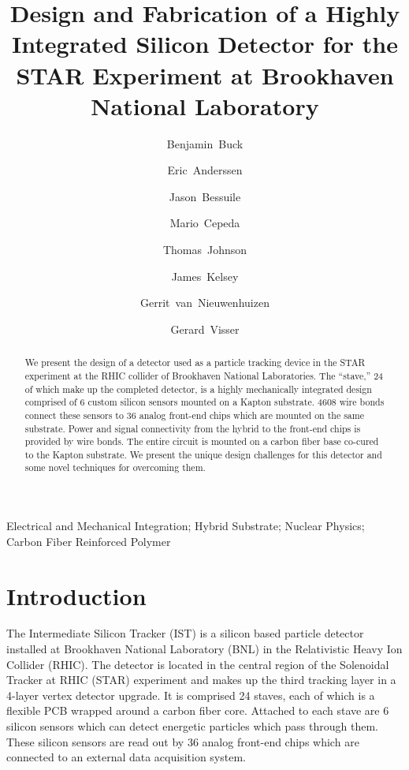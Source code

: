 \documentclass[1p,12pt]{elsarticle}
\begin{document}
\begin{frontmatter}
\title{Design and Fabrication of a Highly Integrated Silicon Detector for the
STAR Experiment at Brookhaven National Laboratory}
%
\author[mit]{Benjamin~Buck}
\author[lbl]{Eric~Anderssen}
\author[mit]{Jason~Bessuile}
\author[lbl]{Mario~Cepeda}
\author[lbl]{Thomas~Johnson}
\author[mit]{James~Kelsey}
\author[mit]{Gerrit~van~Nieuwenhuizen}
\author[iu]{Gerard~Visser}
\address[iu]{Indiana University, Bloomington, IN, USA}
\address[lbl]{Lawrence Berkeley National Laboratory, Berkeley, CA, USA}
\address[mit]{Massachusetts Institute of Technology, Cambridge, MA, USA}
%
%
\begin{abstract}
We present the design of a detector used as a particle tracking device in the
STAR experiment at the RHIC collider of Brookhaven National Laboratories. The
``stave,'' 24 of which make up the completed detector, is a highly mechanically
integrated design comprised of 6 custom silicon sensors mounted on a Kapton
substrate. 4608 wire bonds connect these sensors to 36 analog front-end chips
which are mounted on the same substrate. Power and signal connectivity from the
hybrid to the front-end chips is provided by wire bonds. The entire circuit is
mounted on a carbon fiber base co-cured to the Kapton substrate. We present the
unique design challenges for this detector and some novel techniques for
overcoming them.
\end{abstract}
\begin{keyword}
Electrical and Mechanical Integration; Hybrid Substrate; Nuclear Physics; Carbon
Fiber Reinforced Polymer
\end{keyword}
\end{frontmatter}
%
\section{Introduction}
The Intermediate Silicon Tracker (IST) is a silicon based particle detector
installed at Brookhaven National Laboratory (BNL) in the Relativistic Heavy Ion
Collider (RHIC). The detector is located in the central region of the
Solenoidal Tracker at RHIC (STAR) experiment
and makes up the third tracking layer in a 4-layer vertex detector
upgrade. It is comprised 24 staves, each of which is a flexible PCB wrapped
around a carbon fiber core. Attached to each stave are 6 silicon sensors which
can detect energetic particles which pass through them. These silicon sensors are read
out by 36 analog front-end chips which are connected to an external data acquisition system.
\end{document}
